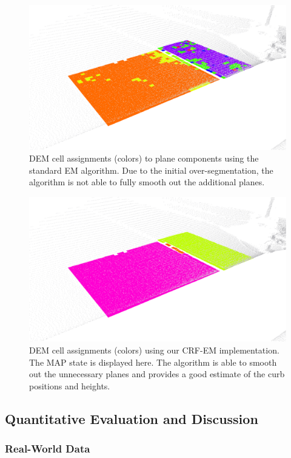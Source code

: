 \begin{figure}[t]
\centering
\includegraphics[width=\columnwidth]{fig/ml.eps}
\caption{DEM cell assignments (colors) to plane components using the standard
EM algorithm. Due to the initial over-segmentation, the algorithm is not able
to fully smooth out the additional planes.}
\label{fig:ml}
\end{figure}

\begin{figure}[t]
\centering
\includegraphics[width=\columnwidth]{fig/crf-em.eps}
\caption{DEM cell assignments (colors) using our CRF-EM implementation. The MAP
state is displayed here. The algorithm is able to smooth out the unnecessary
planes and provides a good estimate of the curb positions and heights.}
\label{fig:crf-em}
\end{figure}

\subsection{Quantitative Evaluation and Discussion}

\subsubsection{Real-World Data}

